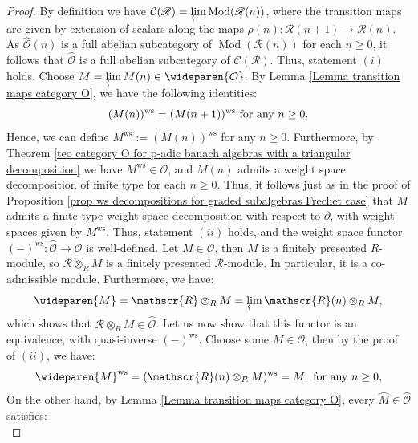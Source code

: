 \documentclass{amsart}
\newcommand{\Mod}{\operatorname{Mod}}
\newcommand{\OX}{\mathcal{O}}
\begin{document}
\begin{proof}
By definition we have $\mathcal{C}(\mathscr{R})=\varprojlim \Mod(\mathscr{R}(n))$, where the transition maps are given by extension of scalars along the maps $\rho(n):\mathscr{R}(n+1)\rightarrow \mathscr{R}(n)$. As $\widehat{\OX}(n)$ is a full abelian subcategory of $\Mod(\mathscr{R}(n))$ for each $n\geq 0$, it follows that $\wideparen{\OX}$ is a full abelian subcategory of $\mathcal{C}(\mathscr{R})$. Thus, statement $(i)$  holds. Choose $M=\varprojlim M(n)\in\wideparen{\OX}$. By Lemma \ref{Lemma transition maps category O}, we have the following identities:
\begin{equation*}
    (M(n))^{\operatorname{ws}}=(M(n+1))^{\operatorname{ws}} \textnormal{ for any } n\geq 0.
\end{equation*}
Hence, we can define $M^{\operatorname{ws}}:=(M(n))^{\operatorname{ws}}$ for any $n\geq 0$. Furthermore, by Theorem \ref{teo category O for p-adic banach algebras with a triangular decomposition} we have $M^{\operatorname{ws}}\in \OX$, and $M(n)$ admits a weight space decomposition of finite type for each $n\geq 0$. Thus, it follows just as in the proof of Proposition \ref{prop ws decompositions for graded subalgebras Frechet case} that $M$ admits a finite-type weight space decomposition with respect to $\partial$, with weight spaces given by $M^{\operatorname{ws}}$. Thus, statement $(ii)$ holds, and the weight space functor $(-)^{\operatorname{ws}}:\wideparen{\OX}\rightarrow \OX$ is well-defined. Let $M\in \OX$, then $M$ is a finitely presented $R$-module, so   $\mathscr{R}\otimes_{R}M$ is a finitely presented $\mathscr{R}$-module. In particular, it is a co-admissible module. Furthermore, we have:
\begin{equation*}
    \wideparen{M}=\mathscr{R}\otimes_{R}M=\varprojlim \mathscr{R}(n)\otimes_{R}M,
\end{equation*}
which shows that $\mathscr{R}\otimes_{R}M\in \wideparen{\OX}$. Let us now show that this functor is an equivalence, with quasi-inverse $(-)^{\operatorname{ws}}$. Choose some $M\in\OX$, then by the proof of $(ii)$, we have:
\begin{equation}\label{equation 1 properties of O}
    \wideparen{M}^{\operatorname{ws}}=(\mathscr{R}(n)\otimes_{R}M)^{\operatorname{ws}}=M, \textnormal{ for any } n\geq 0,
\end{equation}
On the other hand, by Lemma \ref{Lemma transition maps category O}, every $\wideparen{M}\in\wideparen{\OX}$ satisfies:
\begin{equation*}

\end{equation*}
\end{proof}
\end{document}
